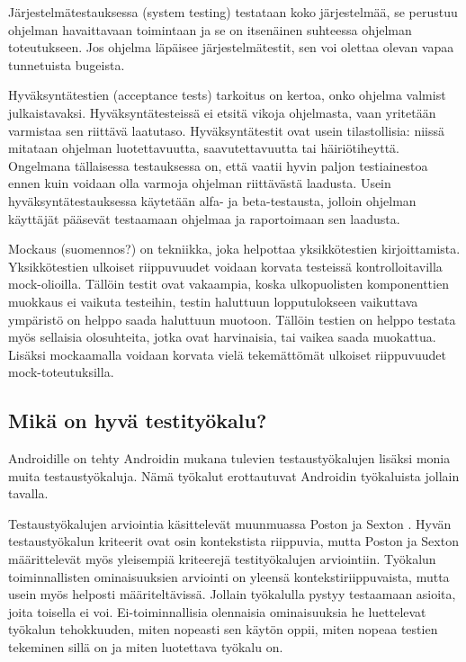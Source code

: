 Järjestelmätestauksessa (system testing) testataan koko järjestelmää, se perustuu ohjelman havaittavaan toimintaan ja se on itsenäinen suhteessa ohjelman toteutukseen. Jos ohjelma läpäisee järjestelmätestit, sen voi olettaa olevan vapaa tunnetuista bugeista. \cite[418-421]{testing}

Hyväksyntätestien (acceptance tests) tarkoitus on kertoa, onko ohjelma valmist julkaistavaksi. Hyväksyntätesteissä ei etsitä vikoja ohjelmasta, vaan yritetään varmistaa sen riittävä laatutaso. Hyväksyntätestit ovat usein tilastollisia: niissä mitataan ohjelman luotettavuutta, saavutettavuutta tai häiriötiheyttä. Ongelmana tällaisessa testauksessa on, että vaatii hyvin paljon testiainestoa ennen kuin voidaan olla varmoja ohjelman riittävästä laadusta. Usein hyväksyntätestauksessa käytetään alfa- ja beta-testausta, jolloin ohjelman käyttäjät pääsevät testaamaan ohjelmaa ja raportoimaan sen laadusta. \cite[421-423]{testing}

Mockaus (suomennos?) on tekniikka, joka helpottaa yksikkötestien kirjoittamista. Yksikkötestien ulkoiset riippuvuudet voidaan korvata testeissä kontrolloitavilla mock-olioilla. Tällöin testit ovat vakaampia, koska ulkopuolisten komponenttien muokkaus ei vaikuta testeihin, testin haluttuun lopputulokseen vaikuttava ympäristö on helppo saada haluttuun muotoon. Tällöin testien on helppo testata myös sellaisia olosuhteita, jotka ovat harvinaisia, tai vaikea saada muokattua. Lisäksi mockaamalla voidaan korvata vielä tekemättömät ulkoiset riippuvuudet mock-toteutuksilla. \cite{mocking}

\subsection{Mikä on hyvä testityökalu?}

Androidille on tehty Androidin mukana tulevien testaustyökalujen lisäksi monia muita testaustyökaluja. Nämä työkalut erottautuvat Androidin työkaluista jollain tavalla.

Testaustyökalujen arviointia käsittelevät muunmuassa Poston ja Sexton \cite{poston92}. Hyvän testaustyökalun kriteerit ovat osin kontekstista riippuvia, mutta Poston ja Sexton määrittelevät myös yleisempiä kriteerejä testityökalujen arviointiin. Työkalun toiminnallisten ominaisuuksien arviointi on yleensä kontekstiriippuvaista, mutta usein myös helposti määriteltävissä. Jollain työkalulla pystyy testaamaan asioita, joita toisella ei voi. Ei-toiminnallisia olennaisia ominaisuuksia he luettelevat työkalun tehokkuuden, miten nopeasti sen käytön oppii, miten nopeaa testien tekeminen sillä on ja miten luotettava työkalu on.